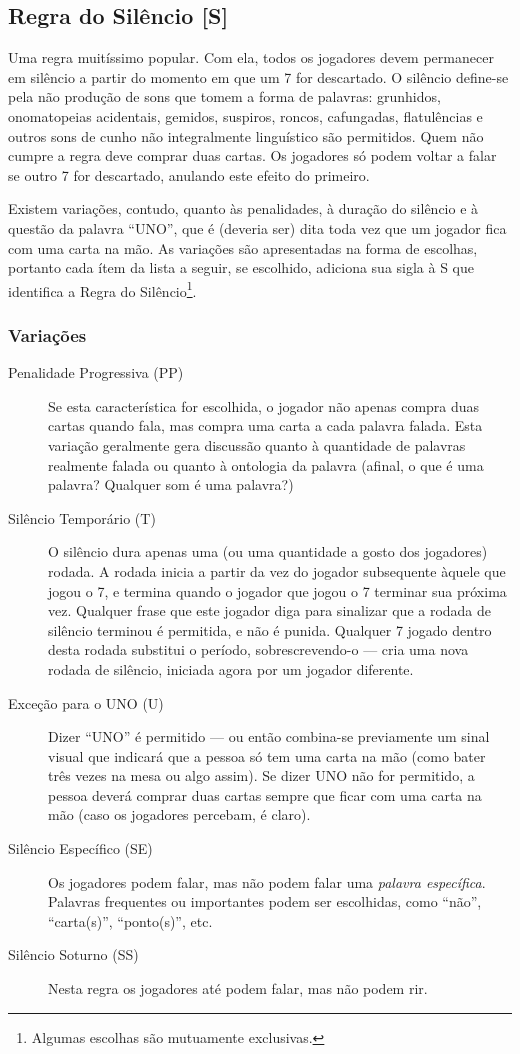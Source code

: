 \subsection{Regra do Silêncio [S]}

Uma regra muitíssimo popular. Com ela, todos os jogadores devem permanecer em silêncio a partir do momento em que um 7 for descartado. O silêncio define-se pela não produção de sons que tomem a forma de palavras: grunhidos, onomatopeias acidentais, gemidos, suspiros, roncos, cafungadas, flatulências e outros sons de cunho não integralmente linguístico são permitidos. Quem não cumpre a regra deve comprar duas cartas. Os jogadores só podem voltar a falar se outro 7 for descartado, anulando este efeito do primeiro.

Existem variações, contudo, quanto às penalidades, à duração do silêncio e à questão da palavra ``UNO'', que é (deveria ser) dita toda vez que um jogador fica com uma carta na mão. As variações são apresentadas na forma de escolhas, portanto cada ítem da lista a seguir, se escolhido, adiciona sua sigla à S que identifica a Regra do Silêncio\footnote{Algumas escolhas são mutuamente exclusivas.}.

\subsubsection{Variações}

\begin{description}
\item[Penalidade Progressiva (PP)]{Se esta característica for escolhida, o jogador não apenas compra duas cartas quando fala, mas compra uma carta a cada palavra falada. Esta variação geralmente gera discussão quanto à quantidade de palavras realmente falada ou quanto à ontologia da palavra (afinal, o que é uma palavra? Qualquer som é uma palavra?)}
\item[Silêncio Temporário (T)]{O silêncio dura apenas uma (ou uma quantidade a gosto dos jogadores) rodada. A rodada inicia a partir da vez do jogador subsequente àquele que jogou o 7, e termina quando o jogador que jogou o 7 terminar sua próxima vez. Qualquer frase que este jogador diga para sinalizar que a rodada de silêncio terminou é permitida, e não é punida. Qualquer 7 jogado dentro desta rodada substitui o período, sobrescrevendo-o --- cria uma nova rodada de silêncio, iniciada agora por um jogador diferente.}
\item[Exceção para o UNO (U)]{Dizer ``UNO'' é permitido --- ou então combina-se previamente um sinal visual que indicará que a pessoa só tem uma carta na mão (como bater três vezes na mesa ou algo assim). Se dizer UNO não for permitido, a pessoa deverá comprar duas cartas sempre que ficar com uma carta na mão (caso os jogadores percebam, é claro).}
\item[Silêncio Específico (SE)]{Os jogadores podem falar, mas não podem falar uma \emph{palavra específica}. Palavras frequentes ou importantes podem ser escolhidas, como ``não'', ``carta(s)'', ``ponto(s)'', etc.}
\item[Silêncio Soturno (SS)]{Nesta regra os jogadores até podem falar, mas não podem rir.}
\end{description}

